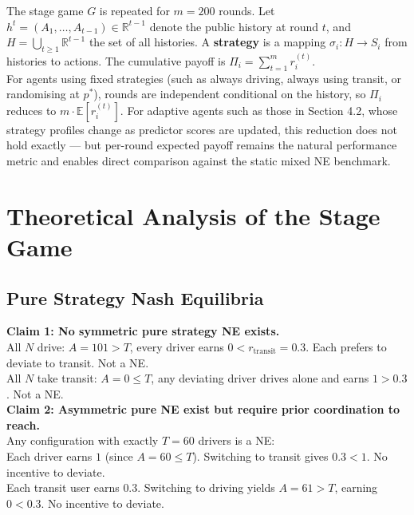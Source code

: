 \documentclass[letterpaper]{article}
\begin{document}
The stage game $G$ is repeated for $m = 200$ rounds. Let $h^t = (A_1, \ldots, A_{t-1}) \in \mathbb{R}^{t-1}$ denote the public history at round $t$, and $H = \bigcup_{t \geq 1} \mathbb{R}^{t-1}$ the set of all histories. A \textbf{strategy} is a mapping $\sigma_i : H \rightarrow S_i$ from histories to actions. The cumulative payoff is $\Pi_i = \sum_{t=1}^{m} r_i^{(t)}$. \\

For agents using fixed strategies (such as always driving, always using transit, or randomising at $p^*$), rounds are independent conditional on the history, so $\Pi_i$ reduces to $m \cdot \mathbb{E}[r_i^{(t)}]$. For adaptive agents such as those in Section 4.2, whose strategy profiles change as predictor scores are updated, this reduction does not hold exactly --- but per-round expected payoff remains the natural performance metric and enables direct comparison against the static mixed NE benchmark. \\

\section{Theoretical Analysis of the Stage Game}

\subsection{Pure Strategy Nash Equilibria}

\textbf{Claim 1: No symmetric pure strategy NE exists.} \\

All $N$ drive: $A = 101 > T$, every driver earns $0 < r_{\text{transit}} = 0.3$. Each prefers to deviate to transit. Not a NE. \\
All $N$ take transit: $A = 0 \leq T$, any deviating driver drives alone and earns $1 > 0.3$. Not a NE. \\

\textbf{Claim 2: Asymmetric pure NE exist but require prior coordination to reach.} \\

Any configuration with exactly $T = 60$ drivers is a NE: \\

Each driver earns $1$ (since $A = 60 \leq T$). Switching to transit gives $0.3 < 1$. No incentive to deviate. \\
Each transit user earns $0.3$. Switching to driving yields $A = 61 > T$, earning $0 < 0.3$. No incentive to deviate. \\
\end{document}

